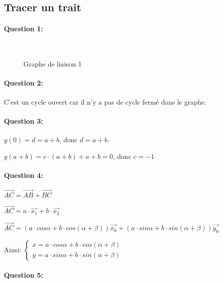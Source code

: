 \subsection{Tracer un trait}

\paragraph{Question 1:} ~\ \\

\begin{figure}[h!]
\begin{center}
  \resizebox{0.4\textwidth}{!}{}
  \caption{\label{fig05} Graphe de liaison 1}
\end{center}
\end{figure}

\paragraph{Question 2:} C'est un cycle ouvert car il n'y a pas de cycle fermé dans le graphe.

\paragraph{Question 3:}
 
$y(0)=d=a+b$, donc $d=a+b$.

$y(a+b)=c\cdot (a+b)+a+b=0$, donc $c=-1$

\paragraph{Question 4:}

$\overrightarrow{AC}=\overrightarrow{AB}+\overrightarrow{BC}$

$\overrightarrow{AC}=a\cdot\vec{x_1}+b\cdot\vec{x_2}$

$\overrightarrow{AC}=(a\cdot cos\alpha+b\cdot cos(\alpha+\beta))\vec{x_0}+(a\cdot sin\alpha+b\cdot sin(\alpha+\beta))\vec{y_0}$

Ainsi:
$\left\{\begin{array}{l}
x=a\cdot cos\alpha+b\cdot cos(\alpha+\beta)\\
y=a\cdot sin\alpha+b\cdot sin(\alpha+\beta)
\end{array}\right.$


\paragraph{Question 5:}

